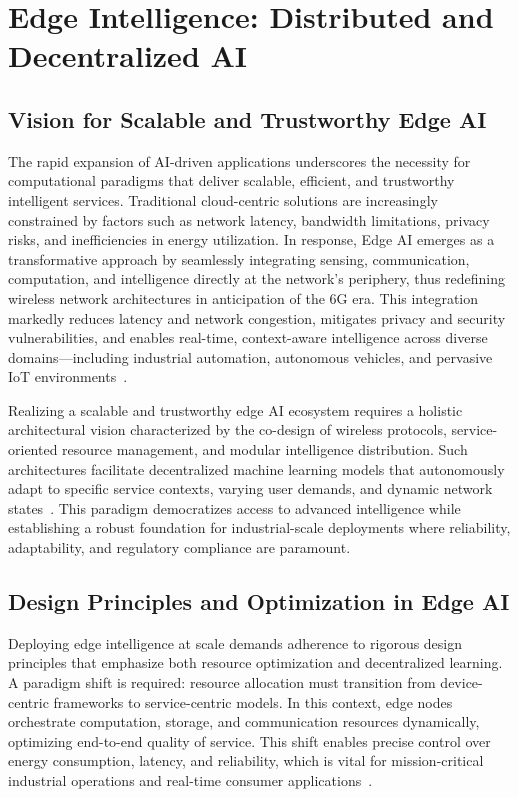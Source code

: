 \documentclass[sigconf]{acmart}
\begin{document}
\section{Edge Intelligence: Distributed and Decentralized AI}

\subsection{Vision for Scalable and Trustworthy Edge AI}

The rapid expansion of AI-driven applications underscores the necessity for computational paradigms that deliver scalable, efficient, and trustworthy intelligent services. Traditional cloud-centric solutions are increasingly constrained by factors such as network latency, bandwidth limitations, privacy risks, and inefficiencies in energy utilization. In response, Edge AI emerges as a transformative approach by seamlessly integrating sensing, communication, computation, and intelligence directly at the network's periphery, thus redefining wireless network architectures in anticipation of the 6G era. This integration markedly reduces latency and network congestion, mitigates privacy and security vulnerabilities, and enables real-time, context-aware intelligence across diverse domains—including industrial automation, autonomous vehicles, and pervasive IoT environments~\cite{ref49}. 

Realizing a scalable and trustworthy edge AI ecosystem requires a holistic architectural vision characterized by the co-design of wireless protocols, service-oriented resource management, and modular intelligence distribution. Such architectures facilitate decentralized machine learning models that autonomously adapt to specific service contexts, varying user demands, and dynamic network states~\cite{ref49}. This paradigm democratizes access to advanced intelligence while establishing a robust foundation for industrial-scale deployments where reliability, adaptability, and regulatory compliance are paramount.

\subsection{Design Principles and Optimization in Edge AI}

Deploying edge intelligence at scale demands adherence to rigorous design principles that emphasize both resource optimization and decentralized learning. A paradigm shift is required: resource allocation must transition from device-centric frameworks to service-centric models. In this context, edge nodes orchestrate computation, storage, and communication resources dynamically, optimizing end-to-end quality of service. This shift enables precise control over energy consumption, latency, and reliability, which is vital for mission-critical industrial operations and real-time consumer applications~\cite{ref49}.
\end{document}
